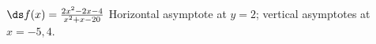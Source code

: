 {$\ds f(x)=\frac{2 x^2-2 x-4}{x^2+x-20}$
}
{Horizontal asymptote at $y=2$; vertical asymptotes at $x=-5,4$.
}
